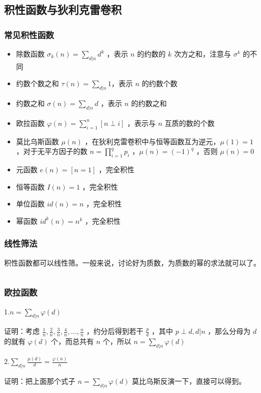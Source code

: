 \documentclass[UTF-8]{ctexart}
\newcommand{\cpp}[1]{\inputminted[bgcolor=bg,breaklines,breakanywhere=true]{c++}{#1}}
\begin{document}
			\cpp{code//Math//pollardrho-mult.cpp}
		\subsection{积性函数与狄利克雷卷积}
			\subsubsection{常见积性函数}
			\begin{itemize}
				\item 除数函数 $\sigma _ k (n)=\sum _ {d|n} d ^ k$ ，表示 $n$ 的约数的 $k$ 次方之和，注意与 $\sigma ^ k$ 的不同   
				\item 约数个数之和 $\tau(n)=\sum _ {d|n} 1$，表示 $n$  的约数个数  
				\item 约数之和 $\sigma(n)=\sum _ {d|n} d$ ，表示 $n$  的约数之和  
				\item 欧拉函数 $\varphi(n)=\sum _ {i=1} ^ n [n \perp i]$ ，表示与 $n$ 互质的数的个数  
				\item 莫比乌斯函数 $\mu(n)$ ，在狄利克雷卷积中与恒等函数互为逆元，$\mu(1)=1$ ，对于无平方因子的数 $n=\prod _ {i=1} ^ q p _ i$ ，$\mu(n)=(-1) ^ q$ ，否则 $\mu(n)=0$  
				\item 元函数 $e(n)=[n=1]$ ，完全积性  
				\item 恒等函数 $I(n)=1$ ，完全积性  
				\item 单位函数 $id(n)=n$ ，完全积性  
				\item 幂函数 $id ^ k (n)=n ^ k$ ，完全积性
			\end{itemize}
			\subsubsection{线性筛法}
			积性函数都可以线性筛。一般来说，讨论好为质数，为质数的幂的求法就可以了。
			
			\cpp{code//Math//sieve.cpp}
			\subsubsection{欧拉函数}
			1.$n=\sum _ {d|n} \varphi(d)$
	
			证明：考虑 $\frac{1}{n},\frac{2}{n},\frac{3}{n},\frac{4}{n},\dots,\frac{n}{n}$ ，约分后得到若干 $\frac{p}{d}$ ，其中 $p \perp d,d|n$ ，那么分母为 $d$ 的就有 $\varphi(d)$ 个，而总共有 $n$ 个，所以 $n=\sum _ {d|n} \varphi(d)$
	
			2.$\sum _ {d|n} \frac{\mu(d)}{d}=\frac{\varphi(n)}{n}$
	
			证明：把上面那个式子 $n=\sum _ {d|n} \varphi(d)$ 莫比乌斯反演一下，直接可以得到。
	
\end{document}
